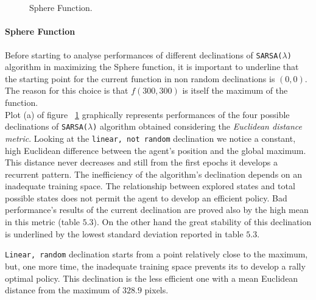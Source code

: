 \begin{figure}[h!]
	\begin{center}
		\\
		 \\
		
	\end{center}
	\caption{
		Sphere Function.
	}
	\label{fig:ParabolicResults}
\end{figure}


\paragraph{Sphere Function} Before starting to analyse performances of different declinations of {\tt SARSA($\lambda$)} algorithm in maximizing the Sphere function, it is important to underline that the starting point for the current function in non random declinations is $(0, 0)$. The reason for this choice is that $f(300, 300)$ is itself the maximum of the function. \\

Plot (a) of figure ~\ref{fig:ParabolicResults} graphically represents performances of the four possible declinations of {\tt SARSA($\lambda$)} algorithm obtained considering the \textit{Euclidean distance metric}. Looking at the {\tt linear, not random} declination we notice a constant, high Euclidean difference between the agent's position and the global maximum. This distance never decreases and still from the first epochs it develops a recurrent pattern. The inefficiency of the algorithm's declination depends on an inadequate training space. The relationship between explored states and total possible states does not permit the agent to develop an efficient policy. Bad performance's results of the current declination are proved also by the high mean in this metric (table $5.3$). On the other hand the great stability of this declination is underlined by the lowest standard deviation reported in table $5.3$.

{\tt Linear, random} declination starts from a point relatively close to the maximum, but, one more time, the inadequate training space prevents its to develop a rally optimal policy. This declination is the less efficient one with a mean Euclidean distance from the maximum of $328.9$ pixels.

